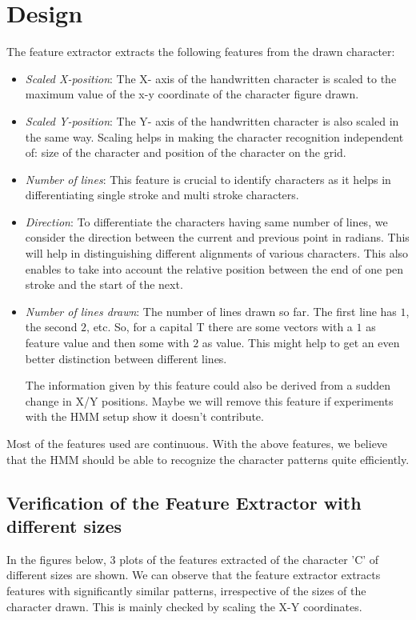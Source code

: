 \section{Design}
The feature extractor extracts the following features from the drawn character:
\begin{itemize}
\item \textit{Scaled X-position}:
The X- axis of the handwritten character is scaled to the maximum value of the x-y coordinate of the character figure drawn.
 
\item \textit{Scaled Y-position}:
The Y- axis of the handwritten character is also scaled in the same way. Scaling helps in making the character recognition independent of: size of the character and position of the character on the grid.

\item \textit{Number of lines}:
This feature is crucial to identify characters as it helps in differentiating single stroke and multi stroke characters.
 
\item \textit{Direction}:
To differentiate the characters having same number of lines, we consider the direction between the current and previous point in radians. This will help in distinguishing different alignments of various characters. This also enables to take into account the relative position between the end of one pen stroke and the start of the next.

\item \textit{Number of lines drawn}:
The number of lines drawn so far. The first line has $1$, the second $2$, etc. So, for a capital T there are some vectors with a $1$ as feature value and then some with $2$ as value. This might help to get an even better distinction between different lines.

The information given by this feature could also be derived from a sudden change in X/Y positions. Maybe we will remove this feature if experiments with the HMM setup show it doesn't contribute.
\end{itemize}
 
Most of the features used are continuous. With the above features, we believe that the HMM should be able to recognize the character patterns quite efficiently.

\subsection{Verification of the Feature Extractor with different sizes}
In the figures below, 3 plots of the features extracted of the character 'C' of different sizes are shown. We can observe that the feature extractor extracts features with significantly similar patterns, irrespective of the sizes of the character drawn. This is mainly checked by scaling the X-Y coordinates.
 
